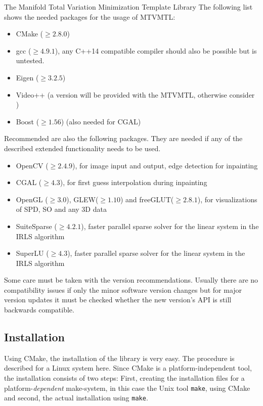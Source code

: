 \begin{chapter}{The Manifold Total Variation Minimization Template Library}
The following list shows the needed packages for the usage of MTVMTL:
\begin{itemize}
    \item CMake ($\geq 2.8.0$)
    \item gcc ($\geq 4.9.1$), any C++14 compatible compiler should also be possible but is untested.
    \item Eigen ($\geq 3.2.5$)
    \item Video++ (a version will be provided with the MTVMTL, otherwise consider \cite{VPP} )
    \item Boost ($\geq 1.56$) (also needed for CGAL)
\end{itemize}

Recommended are also the following packages. They are needed if any of the described extended functionality needs to be used.
\begin{itemize}
    \item OpenCV ($\geq 2.4.9$), for image input and output, edge detection for inpainting
    \item CGAL ($\geq 4.3$), for first guess interpolation during inpainting
    \item OpenGL ($\geq 3.0$), GLEW($\geq 1.10$) and freeGLUT($\geq 2.8.1$),  for visualizations of SPD, SO and any 3D data
    \item SuiteSparse ($\geq 4.2.1$), faster parallel sparse solver for the linear system in the IRLS algorithm
    \item SuperLU ($\geq 4.3$), faster parallel sparse solver for the linear system in the IRLS algorithm
\end{itemize}
Some care must be taken with the version recommendations. Usually there are no compatibility issues if only the minor software version changes but for major version updates it must
be checked whether the new version's API is still backwards compatible.


\subsection{Installation} %
\label{sub:Installation}
Using CMake, the installation of the library is very easy. The procedure is described for a Linux system here.
Since CMake is a platform-independent tool, the installation consists of two steps: First, creating the installation
files for a platform-\emph{dependent} make-system, in this case the Unix tool \texttt{make}, using CMake and second, the actual installation using \texttt{make}.\\


\end{chapter}

